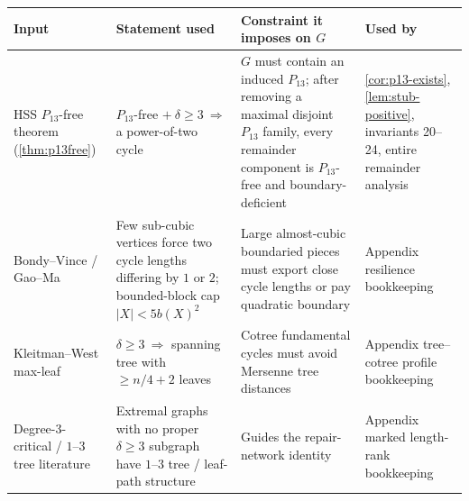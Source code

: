 \documentclass[11pt]{article}
\begin{document}
{\small
\begin{longtable}{L{0.17\textwidth} L{0.28\textwidth} L{0.27\textwidth} L{0.20\textwidth}}
\toprule
\textbf{Input} & \textbf{Statement used} & \textbf{Constraint it imposes on $G$} & \textbf{Used by} \\
\midrule
\endhead
HSS $P_{13}$-free theorem (\cref{thm:p13free}) & $P_{13}$-free $+\ \delta\ge3\ \Rightarrow$ a power-of-two cycle & $G$ must contain an induced $P_{13}$; after removing a maximal disjoint $P_{13}$ family, every remainder component is $P_{13}$-free and boundary-deficient & \cref{cor:p13-exists}, \cref{lem:stub-positive}, invariants 20--24, entire remainder analysis \\
Bondy--Vince / Gao--Ma & Few sub-cubic vertices force two cycle lengths differing by $1$ or $2$; bounded-block cap $|X|<5b(X)^2$ & Large almost-cubic boundaried pieces must export close cycle lengths or pay quadratic boundary & Appendix resilience bookkeeping \\
Kleitman--West max-leaf & $\delta\ge3\ \Rightarrow$ spanning tree with $\ge n/4+2$ leaves & Cotree fundamental cycles must avoid Mersenne tree distances & Appendix tree--cotree profile bookkeeping \\
Degree-3-critical / $1$--$3$ tree literature & Extremal graphs with no proper $\delta\ge3$ subgraph have $1$--$3$ tree / leaf-path structure & Guides the repair-network identity & Appendix marked length-rank bookkeeping \\
\bottomrule
\end{longtable}
}
\end{document}
